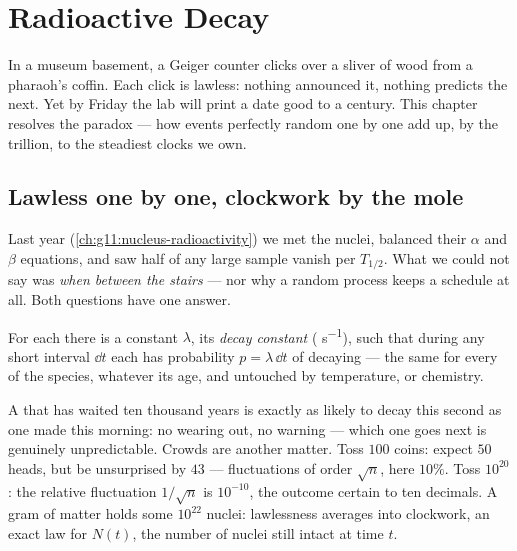 \chapter{Radioactive Decay}\label{ch:g12:radioactive-decay}

In a museum basement, a Geiger counter clicks over a sliver of wood from a
pharaoh's coffin. Each click is lawless: nothing announced it, nothing
predicts the next. Yet by Friday the lab will print a date good to a
century. This chapter resolves the paradox --- how events perfectly random
one by one add up, by the trillion, to the steadiest clocks we own.

\section{Lawless one by one, clockwork by the mole}

Last year (\cref{ch:g11:nucleus-radioactivity}) we met the 
nuclei, balanced their $\alpha$ and $\beta$ equations, and saw half of any
large sample vanish per  $T_{1/2}$. What we could not say was
\emph{when between the stairs} --- nor why a random process keeps a
schedule at all. Both questions have one answer.

\begin{definition}\label{def:g12:radioactive-decay:lambda}
For each   there is a constant $\lambda$, its \emph{decay
constant} ( \unit{s^{-1}}), such that during any
short interval $\dd t$ each  has probability $p = \lambda\,\dd t$ of
decaying --- the same for every  of the species, whatever its age,
and untouched by temperature,  or chemistry.
\end{definition}

\begin{remark}\label{rem:g12:radioactive-decay:crowds}
A  that has waited ten thousand years is exactly as likely to decay
this second as one made this morning: no wearing out, no warning --- which
one goes next is genuinely unpredictable. Crowds are another matter. Toss
$100$ coins: expect $50$ heads, but be unsurprised by $43$ ---
fluctuations of order $\sqrt n$, here $10\%$. Toss $10^{20}$: the
relative fluctuation $1/\sqrt n$ is $10^{-10}$, the outcome certain to
ten decimals. A gram of matter holds some $10^{22}$ nuclei: lawlessness
averages into clockwork, an exact law for $N(t)$, the number of nuclei
still intact at time $t$.
\end{remark}

